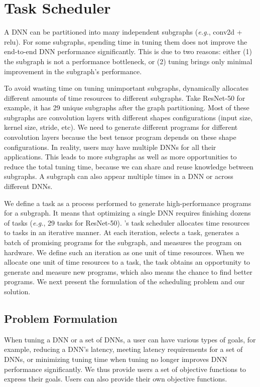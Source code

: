 \section{Task Scheduler}
\label{sec:task-scheduler}

A DNN can be partitioned into many independent subgraphs (\textit{e.g.}, conv2d + relu). For some subgraphs, spending time in tuning them does not improve the end-to-end DNN performance significantly. This is due to two reasons: either (1) the subgraph is not a performance bottleneck, or (2) tuning brings only minimal improvement in the subgraph's performance.

To avoid wasting time on tuning unimportant subgraphs, \Ansor dynamically allocates different amounts of time resources to different subgraphs.
Take ResNet-50 for example, it has 29 unique subgraphs after the graph partitioning.
Most of these subgraphs are convolution layers with different shapes configurations (input size, kernel size, stride, etc). We need to generate different programs for different convolution layers because the best tensor program depends on these shape configurations. 
In reality, users may have multiple DNNs for all their applications. This leads to more subgraphs as well as more opportunities to reduce the total tuning time, because we can share and reuse knowledge between subgraphs.
A subgraph can also appear multiple times in a DNN or across different DNNs.

We define a task as a process performed to generate high-performance programs for a subgraph.
It means that optimizing a single DNN requires finishing dozens of tasks (\textit{e.g.}, 29 tasks for ResNet-50).
\Ansor's task scheduler allocates time resources to tasks in an iterative manner.
At each iteration, \Ansor selects a task, generates a batch of promising programs for the subgraph, and measures the program on hardware.
We define such an iteration as one unit of time resources. When we allocate one unit of time resources to a task, the task obtains an opportunity to generate and measure new programs, which also means the chance to find better programs.
We next present the formulation of the scheduling problem and our solution.

\subsection{Problem Formulation}
\label{subsec:task-scheduler-problem}
When tuning a DNN or a set of DNNs, a user can have various types of goals, for example, reducing a DNN's latency, meeting latency requirements for a set of DNNs, or minimizing tuning time when tuning no longer improves DNN performance significantly. We thus provide users a set of objective functions to express their goals. Users can also provide their own objective functions. 

